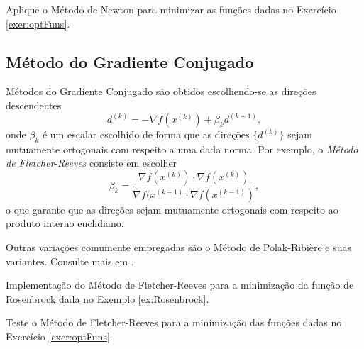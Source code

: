 \begin{exer}
  Aplique o Método de Newton para minimizar as funções dadas no Exercício \ref{exer:optFuns}.
\end{exer}

\subsection{Método do Gradiente Conjugado}

Métodos do Gradiente Conjugado são obtidos escolhendo-se as direções descendentes
\begin{equation}
  d^{(k)} = -\nabla f(x^{(k)}) + \beta_k d^{(k-1)},
\end{equation}
onde $\beta_k$ é um escalar escolhido de forma que as direções $\{d^{(k)}\}$ sejam mutuamente ortogonais com respeito a uma dada norma. Por exemplo, o \emph{Método de Fletcher}-\emph{Reeves} consiste em escolher
\begin{equation}
  \beta_k = \frac{\nabla f(x^{(k)})\cdot\nabla f(x^{(k)})}{\nabla f(x^{(k-1)}\cdot\nabla f(x^{(k-1)})},
\end{equation}
o que garante que as direções sejam mutuamente ortogonais com respeito ao produto interno euclidiano.

\begin{obs}
  Outras variações comumente empregadas são o Método de Polak-Ribière e suas variantes. Consulte mais em \cite[Seção 5.2]{Nocedal2003}.
\end{obs}

\begin{ex}
  Implementação do Método de Fletcher-Reeves para a minimização da função de Rosenbrock dada no Exemplo \ref{ex:Rosenbrock}.
  
      
\end{ex}

\begin{exer}
  Teste o Método de Fletcher-Reeves para a minimização das funções dadas no Exercício \ref{exer:optFuns}.
\end{exer}